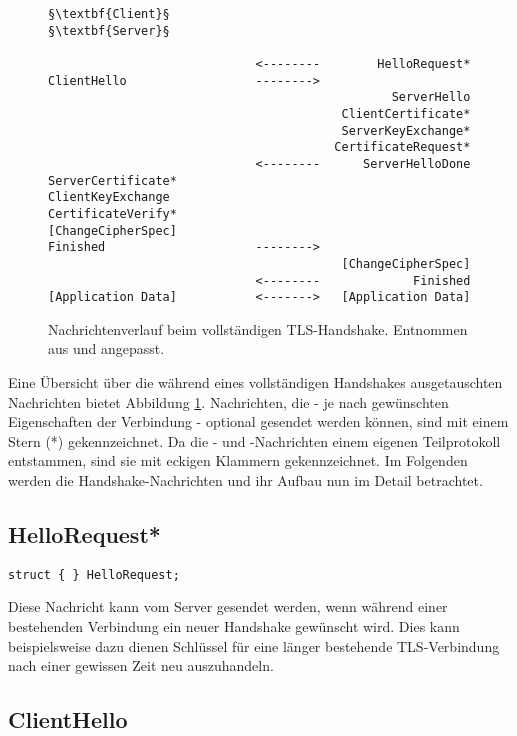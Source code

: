 \lstset{
	style=default,
	frame=single
}
\begin{figure}[H]
	\centering
	\begin{lstlisting}
§\textbf{Client}§                                               §\textbf{Server}§

                             <--------        HelloRequest*
ClientHello                  -------->
                                                ServerHello
                                         ClientCertificate*
                                         ServerKeyExchange*
                                        CertificateRequest*
                             <--------      ServerHelloDone
ServerCertificate*
ClientKeyExchange
CertificateVerify*
[ChangeCipherSpec]
Finished                     -------->
                                         [ChangeCipherSpec]
                             <--------             Finished
[Application Data]           <------->   [Application Data]
	\end{lstlisting}
	\caption{Nachrichtenverlauf beim vollständigen TLS-Handshake. Entnommen aus \cite{tls12} und angepasst.}
	\label{fig_complete_handshake}
\end{figure}
\lstset{style=tls}

Eine Übersicht über die während eines vollständigen Handshakes ausgetauschten Nachrichten bietet Abbildung \ref{fig_complete_handshake}. Nachrichten, die - je nach gewünschten Eigenschaften der Verbindung - optional gesendet werden können, sind mit einem Stern (*) gekennzeichnet. Da die \changecipherspec{}- und \applicationdata{}-Nachrichten einem eigenen Teilprotokoll entstammen, sind sie mit eckigen Klammern gekennzeichnet. Im Folgenden werden die Handshake-Nachrichten und ihr Aufbau nun im Detail betrachtet.

\subsection{HelloRequest*}

\begin{lstlisting}
struct { } HelloRequest;
\end{lstlisting}

Diese Nachricht kann vom Server gesendet werden, wenn während einer bestehenden Verbindung ein neuer Handshake gewünscht wird. Dies kann beispielsweise dazu dienen Schlüssel für eine länger bestehende TLS-Verbindung nach einer gewissen Zeit neu auszuhandeln.

\subsection{ClientHello}
\label{sec_handshake_client_hello}

